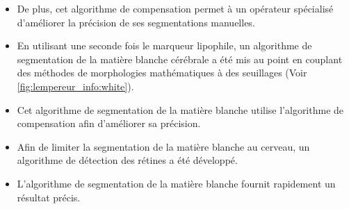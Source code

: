 \documentclass[\main/main.tex]{subfiles}
\begin{document}
\begin{itemize}
    \item
    De plus, cet algorithme de compensation permet à un opérateur spécialisé
    d'améliorer la précision de ses segmentations manuelles.
    
    \item
    En utilisant une seconde fois le marqueur lipophile, un algorithme de segmentation de la matière blanche cérébrale a été mis au point en couplant des méthodes de morphologies mathématiques à des seuillages (Voir \autoref{fig:lempereur_info:white}).
    
    \item
    Cet algorithme de segmentation de la matière blanche utilise
    l'algorithme de compensation afin d'améliorer sa précision.
    
    \item
    Afin de limiter la segmentation de la matière blanche au cerveau,
    un algorithme de détection des rétines a été développé.
    
    \item
    L'algorithme de segmentation de la matière blanche fournit rapidement un résultat précis. 
    
\end{itemize}
\end{document}
